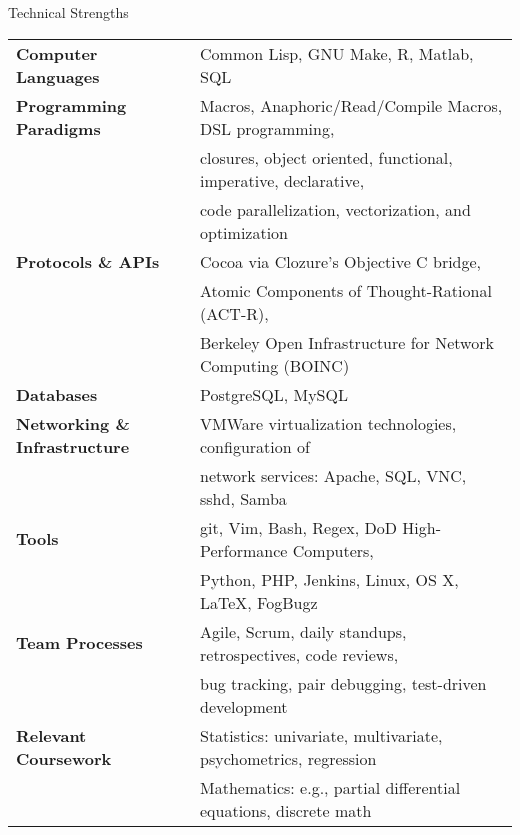

\begin{rSection}{Technical Strengths}

\begin{tabular}{ @{} >{\bfseries}l @{\hspace{6ex}} l }
Computer Languages & 		Common Lisp, GNU Make, R, Matlab, SQL \\
Programming Paradigms &		Macros, Anaphoric/Read/Compile Macros, DSL programming, \\
& 				closures, object oriented, functional, imperative, declarative, \\
&				code parallelization, vectorization, and optimization \\
Protocols \& APIs & 		Cocoa via Clozure's Objective C bridge, \\
&				Atomic Components of Thought-Rational (ACT-R), \\
&				Berkeley Open Infrastructure for Network Computing (BOINC) \\
Databases &			PostgreSQL, MySQL \\
Networking \& Infrastructure &	VMWare virtualization technologies, configuration of \\
&				network services: Apache, SQL, VNC, sshd, Samba \\
Tools & 			git, Vim, Bash, Regex, DoD High-Performance Computers, \\
&				Python, PHP, Jenkins, Linux, OS X, \LaTeX, FogBugz \\
Team Processes & 		Agile, Scrum, daily standups, retrospectives, code reviews, \\
& 				bug tracking, pair debugging, test-driven development \\
Relevant Coursework &		Statistics: univariate, multivariate, psychometrics, regression \\
&				Mathematics: e.g., partial differential equations, discrete math
\end{tabular}

\end{rSection}

